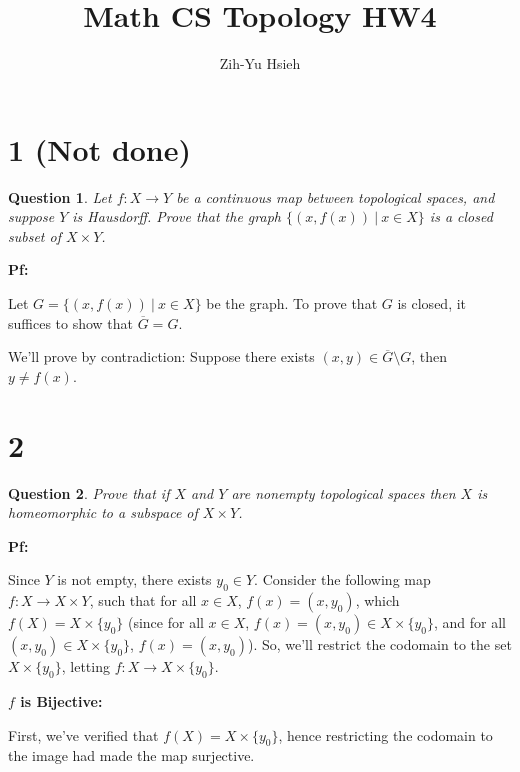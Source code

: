\documentclass{article}
\title{Math CS Topology HW4}
\author{Zih-Yu Hsieh}
\newtheorem{question}{Question}
\begin{document}
\maketitle

\section*{1 (Not done)}
\begin{myBox}[]{}
    \begin{question}
        Let $f:X\rightarrow Y$ be a continuous map between topological spaces, and suppose
        $Y$ is Hausdorff. Prove that the graph $\{(x,f(x))\ |\ x\in X\}$ is a closed subset of
        $X\times Y$.
    \end{question}
\end{myBox}

\textbf{Pf:}

Let $G=\{(x,f(x))\ |\ x\in X\}$ be the graph. To prove that $G$ is closed, it suffices to show that $\overline{G}=G$.

\hfill

We'll prove by contradiction: Suppose there exists $(x,y)\in \overline{G}\setminus G$, then $y\neq f(x)$.

\break

\section*{2}
\begin{myBox}[]{}
    \begin{question}
        Prove that if $X$ and $Y$ are nonempty topological spaces then 
        $X$ is homeomorphic to a subspace of $X\times Y$.
    \end{question}
\end{myBox}

\textbf{Pf:}

Since $Y$ is not empty, there exists $y_0\in Y$. Consider the following map $f:X\rightarrow X\times Y$, such that for all $x\in X$,
$f(x)=(x,y_0)$, which $f(X)=X\times \{y_0\}$ (since for all $x\in X$, $f(x)=(x,y_0)\in X\times \{y_0\}$, and for all $(x,y_0)\in X\times \{y_0\}$, $f(x)=(x,y_0)$).
So, we'll restrict the codomain to the set $X\times \{y_0\}$, letting $f:X\rightarrow X\times \{y_0\}$.

\hfill

\textbf{$f$ is Bijective:}

First, we've verified that $f(X)=X\times \{y_0\}$, hence restricting the codomain to the image had made the map surjective.
\end{document}
